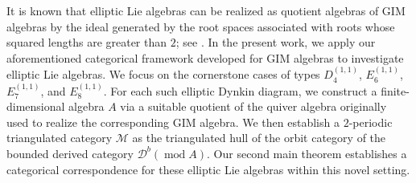 \documentclass[12pt,reqno]{amsart}
\numberwithin{equation}{section}
\renewcommand{\mod}{\operatorname{mod}\nolimits}
\begin{document}
	It is known that elliptic Lie algebras can be realized as quotient algebras of GIM algebras by the ideal generated by the root spaces associated with roots whose squared lengths are greater than $2$; see \cite{SY00}. In the present work, we apply our aforementioned categorical framework developed for GIM algebras to investigate elliptic Lie algebras. We focus on the cornerstone cases of types $D_4^{(1,1)}$, $E_6^{(1,1)}$, $E_7^{(1,1)}$, and $E_8^{(1,1)}$. For each such elliptic Dynkin diagram, we construct a finite-dimensional algebra $A$ via a suitable quotient of the quiver algebra originally used to realize the corresponding GIM algebra. We then establish a $2$-periodic triangulated category $\mathcal{M}$ as the triangulated hull of the orbit category of the bounded derived category $\mathcal{D}^b(\mod A)$. Our second main theorem establishes a categorical correspondence for these elliptic Lie algebras within this novel setting.
	
	
	
	
\end{document}
